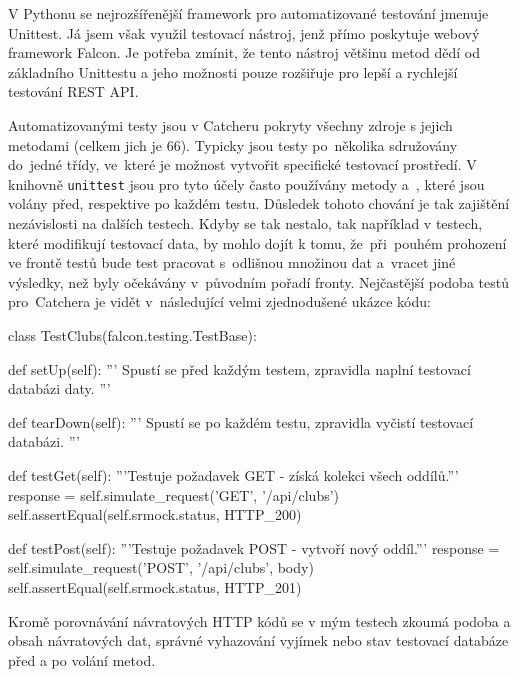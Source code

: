 V Pythonu se nejrozšířenější framework pro automatizované testování jmenuje Unittest. Já jsem však využil testovací nástroj, jenž přímo
poskytuje webový framework Falcon. Je potřeba zmínit, že tento nástroj většinu metod dědí od základního Unittestu a jeho možnosti pouze
rozšiřuje pro lepší a rychlejší testování REST API.

Automatizovanými testy jsou v Catcheru pokryty všechny zdroje s jejich metodami (celkem jich je 66). Typicky jsou testy po~několika sdružovány do~jedné třídy,
ve~které je možnost vytvořit specifické testovací prostředí. V knihovně \texttt{unittest} jsou pro tyto účely často používány metody  a~,
které jsou volány před, respektive po každém testu. Důsledek tohoto chování je tak zajištění nezávislosti na dalších testech.
Kdyby se tak nestalo, tak například v testech, které modifikují testovací data, by mohlo dojít k tomu, že~při~pouhém prohození ve frontě testů
bude test pracovat s~odlišnou množinou dat a~vracet jiné výsledky, než byly očekávány v~původním pořadí fronty. Nejčastější podoba testů pro~Catchera
je vidět v~následující velmi zjednodušené ukázce kódu: 

\begin{python}
class TestClubs(falcon.testing.TestBase):

    def setUp(self):
      '''
      Spustí se před každým testem,
      zpravidla naplní testovací databázi daty.
      '''

    def tearDown(self):
      '''
      Spustí se po každém testu,
      zpravidla vyčistí testovací databázi.
      '''

    def testGet(self):
      '''Testuje požadavek GET - získá kolekci všech oddílů.'''     
      response = self.simulate_request('GET', '/api/clubs')
      self.assertEqual(self.srmock.status, HTTP_200)

    def testPost(self):
      '''Testuje požadavek POST - vytvoří nový oddíl.'''
      response = self.simulate_request('POST', '/api/clubs', body)
      self.assertEqual(self.srmock.status, HTTP_201)
\end{python}

Kromě porovnávání návratových HTTP kódů se v mým testech zkoumá podoba a obsah návratových dat, správné vyhazování vyjímek
nebo stav testovací databáze před a po volání metod.